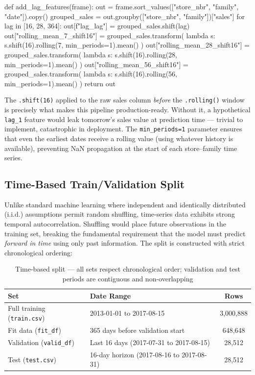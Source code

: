 \begin{pythoncode}[caption={Lag and rolling features with shift-16 guard}]
def add_lag_features(frame):
    out = frame.sort_values(["store_nbr", "family", "date"]).copy()
    grouped_sales = out.groupby(["store_nbr", "family"])["sales"]
    for lag in [16, 28, 364]:
        out[f"lag_{lag}"] = grouped_sales.shift(lag)
    out["rolling_mean_7_shift16"] = grouped_sales.transform(
        lambda s: s.shift(16).rolling(7, min_periods=1).mean()
    )
    out["rolling_mean_28_shift16"] = grouped_sales.transform(
        lambda s: s.shift(16).rolling(28, min_periods=1).mean()
    )
    out["rolling_mean_56_shift16"] = grouped_sales.transform(
        lambda s: s.shift(16).rolling(56, min_periods=1).mean()
    )
    return out
\end{pythoncode}

The \texttt{.shift(16)} applied to the raw sales column \textit{before} the \texttt{.rolling()} window is precisely what makes this pipeline production-ready. Without it, a hypothetical \texttt{lag\_1} feature would leak tomorrow's sales value at prediction time — trivial to implement, catastrophic in deployment. The \texttt{min\_periods=1} parameter ensures that even the earliest dates receive a rolling value (using whatever history is available), preventing NaN propagation at the start of each store–family time series.

\subsection{Time-Based Train/Validation Split}

Unlike standard machine learning where independent and identically distributed (i.i.d.) assumptions permit random shuffling, time-series data exhibits strong temporal autocorrelation. Shuffling would place future observations in the training set, breaking the fundamental requirement that the model must predict \textit{forward in time} using only past information. The split is constructed with strict chronological ordering:

\begin{table}[H]
\centering{}
\begin{tabular}{l L{4cm} c}
\toprule{}\color{white}\textbf{Set} &\color{white}\textbf{Date Range} &\color{white}\textbf{Rows}\\
\midrule
Full training (\texttt{train.csv}) & 2013-01-01 to 2017-08-15 & 3,000,888\\
Fit data (\texttt{fit\_df}) & 365 days before validation start & 648,648\\
Validation (\texttt{valid\_df}) & Last 16 days (2017-07-31 to 2017-08-15) & 28,512\\
Test (\texttt{test.csv}) & 16-day horizon (2017-08-16 to 2017-08-31) & 28,512\\
\bottomrule
\end{tabular}
\caption{Time-based split — all sets respect chronological order; validation and test periods are contiguous and non-overlapping}
\end{table}

